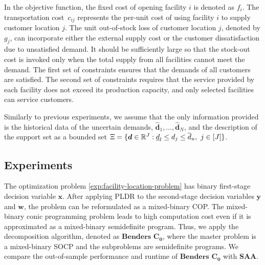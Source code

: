 \documentclass{article}
\newcommand{\RR}{\mathbb{R}}
\begin{document}
In the objective function, the fixed cost of opening facility $i$ is denoted as $f_i$. The transportation cost~$c_{ij}$ represents the per-unit cost of using facility $i$ to supply customer location $j$. The unit out-of-stock loss of customer location $j$, denoted by $g_j$, can incorporate either the external supply cost or the customer dissatisfaction due to unsatisfied demand. It should be sufficiently large so that the stock-out cost is invoked only when the total supply from all facilities cannot meet the demand. The first set of constraints ensures that the demands of all customers are satisfied. The second set of constraints requires that the service provided by each facility does not exceed its production capacity, and only selected facilities can service customers.

Similarly to previous experiments, we assume that the only information provided is the historical data of the uncertain demands, $\hat{\bm d}_1,\ldots,\hat{\bm d}_N$, and the description of the support set as a bounded set $ \Xi= \{ \bm d \in \RR^{J}: \linebreak \underline{d}_l \leq d_j \leq \overline{d}_u, \ j \in [J]\} $.

\subsection{Experiments}

The optimization problem \eqref{exp:facility-location-problem} has binary first-stage decision variable $\bm x$. 
After applying PLDR to the second-stage decision variables $\bm y$ and $\bm w$, the problem can be reformulated as a mixed-binary COP. The mixed-binary conic programming problem leads to high computation cost even if it is approximated as a mixed-binary semidefinite program. Thus, we apply the decomposition algorithm, denoted as $\textbf{Benders $\mathbf{C_0}$}$, where the master problem is a mixed-binary SOCP and the subproblems are semidefinite programs. We compare the out-of-sample performance and runtime of $\textbf{Benders $\mathbf{C_0}$}$ with $\textbf{SAA}$.
\end{document}
